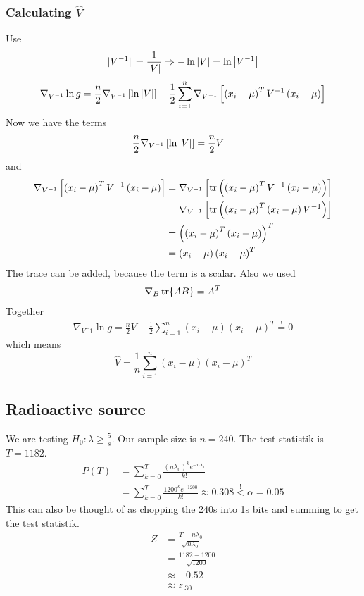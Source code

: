 \subsubsection{Calculating $\hat{V}$}
Use
\begin{equation}
    \abs*{V^{-1}}=\frac{1}{\abs{V}}\Rightarrow -\ln\abs{V}=\ln\abs{V^{-1}}
\end{equation}
\begin{align}
    \nabla_{V^{-1}} \ln g = \frac{n}{2}\nabla_{V^{-1}}\left[\ln\abs{V}\right]
    -\frac{1}{2}\sum_{i=1}^{n}\nabla_{V^{-1}}\left[\left(x_i-\mu\right)^TV^{-1}\left(x_i-\mu\right)\right]
\end{align}
Now we have the terms
\begin{align}
    \frac{n}{2}\nabla_{V^{-1}}\left[\ln\abs{V}\right]&=\frac{n}{2}V
\end{align}
and
\begin{align}
    \nabla_{V^{-1}}\left[\left(x_i-\mu\right)^TV^{-1}\left(x_i-\mu\right)\right]&=\nabla_{V^{-1}}\left[\trace\left(\left(x_i-\mu\right)^TV^{-1}\left(x_i-\mu\right)\right)\right]
    \\&=\nabla_{V^{-1}}\left[\trace\left(\left(x_i-\mu\right)^T\left(x_i-\mu\right)V^{-1}\right)\right]
    \\&=\left(\left(x_i-\mu\right)^T\left(x_i-\mu\right)\right)^T
    \\&=\left(x_i-\mu\right)\left(x_i-\mu\right)^T
\end{align}
The trace can be added, because the term is a scalar.
Also we used
\begin{align}
    \nabla_{B}\tr{AB}=A^T
\end{align}
Together
\begin{align}
    \nabla_{V^-1}\ln g = \frac{n}{2}V-\frac{1}{2}\sum_{i=1}^{n}\left(x_i-\mu\right)\left(x_i-\mu\right)^T\overset{!}{=}0
\end{align}
which means
\begin{equation}
    \hat{V}=\frac{1}{n}\sum_{i=1}^{n}\left(x_i-\mu\right)\left(x_i-\mu\right)^T
\end{equation}
\subsection{Radioactive source}
We are testing $H_0:\lambda\geq\frac{5}{s}$. Our sample size is $n=240$. The test statistik is $T=1182$.
\begin{align}
    P\left(T\right)&=\sum_{k=0}^T\frac{(n\lambda_0)^ke^{-n\lambda_0}}{k!}
    \\&=\sum_{k=0}^{T}\frac{1200^ke^{-1200}}{k!}\approx 0.308 \overset{!}{<}\alpha=0.05
\end{align}
This can also be thought of as chopping the 240s into 1s bits and summing to get the test statistik.
\begin{align}
    Z&=\frac{T-n\lambda_0}{\sqrt{n\lambda_0}}
    \\&=\frac{1182-1200}{\sqrt{1200}}
    \\&\approx -0.52
    \\&\approx z_{.30}
\end{align}
